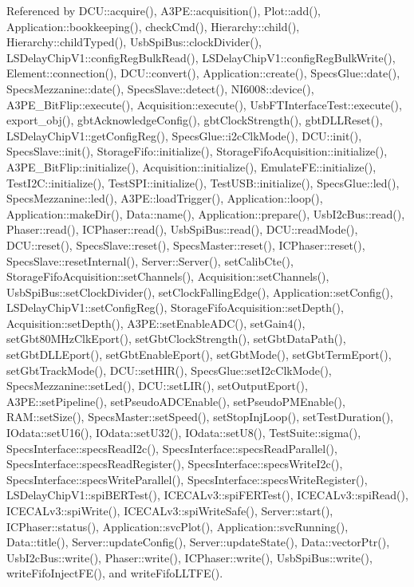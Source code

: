 Referenced by D\+C\+U\+::acquire(), A3\+P\+E\+::acquisition(), Plot\+::add(), Application\+::bookkeeping(), check\+Cmd(), Hierarchy\+::child(), Hierarchy\+::child\+Typed(), Usb\+Spi\+Bus\+::clock\+Divider(), L\+S\+Delay\+Chip\+V1\+::config\+Reg\+Bulk\+Read(), L\+S\+Delay\+Chip\+V1\+::config\+Reg\+Bulk\+Write(), Element\+::connection(), D\+C\+U\+::convert(), Application\+::create(), Specs\+Glue\+::date(), Specs\+Mezzanine\+::date(), Specs\+Slave\+::detect(), N\+I6008\+::device(), A3\+P\+E\+\_\+\+Bit\+Flip\+::execute(), Acquisition\+::execute(), Usb\+F\+T\+Interface\+Test\+::execute(), export\+\_\+obj(), gbt\+Acknowledge\+Config(), gbt\+Clock\+Strength(), gbt\+D\+L\+L\+Reset(), L\+S\+Delay\+Chip\+V1\+::get\+Config\+Reg(), Specs\+Glue\+::i2c\+Clk\+Mode(), D\+C\+U\+::init(), Specs\+Slave\+::init(), Storage\+Fifo\+::initialize(), Storage\+Fifo\+Acquisition\+::initialize(), A3\+P\+E\+\_\+\+Bit\+Flip\+::initialize(), Acquisition\+::initialize(), Emulate\+F\+E\+::initialize(), Test\+I2\+C\+::initialize(), Test\+S\+P\+I\+::initialize(), Test\+U\+S\+B\+::initialize(), Specs\+Glue\+::led(), Specs\+Mezzanine\+::led(), A3\+P\+E\+::load\+Trigger(), Application\+::loop(), Application\+::make\+Dir(), Data\+::name(), Application\+::prepare(), Usb\+I2c\+Bus\+::read(), Phaser\+::read(), I\+C\+Phaser\+::read(), Usb\+Spi\+Bus\+::read(), D\+C\+U\+::read\+Mode(), D\+C\+U\+::reset(), Specs\+Slave\+::reset(), Specs\+Master\+::reset(), I\+C\+Phaser\+::reset(), Specs\+Slave\+::reset\+Internal(), Server\+::\+Server(), set\+Calib\+Cte(), Storage\+Fifo\+Acquisition\+::set\+Channels(), Acquisition\+::set\+Channels(), Usb\+Spi\+Bus\+::set\+Clock\+Divider(), set\+Clock\+Falling\+Edge(), Application\+::set\+Config(), L\+S\+Delay\+Chip\+V1\+::set\+Config\+Reg(), Storage\+Fifo\+Acquisition\+::set\+Depth(), Acquisition\+::set\+Depth(), A3\+P\+E\+::set\+Enable\+A\+D\+C(), set\+Gain4(), set\+Gbt80\+M\+Hz\+Clk\+Eport(), set\+Gbt\+Clock\+Strength(), set\+Gbt\+Data\+Path(), set\+Gbt\+D\+L\+L\+Eport(), set\+Gbt\+Enable\+Eport(), set\+Gbt\+Mode(), set\+Gbt\+Term\+Eport(), set\+Gbt\+Track\+Mode(), D\+C\+U\+::set\+H\+I\+R(), Specs\+Glue\+::set\+I2c\+Clk\+Mode(), Specs\+Mezzanine\+::set\+Led(), D\+C\+U\+::set\+L\+I\+R(), set\+Output\+Eport(), A3\+P\+E\+::set\+Pipeline(), set\+Pseudo\+A\+D\+C\+Enable(), set\+Pseudo\+P\+M\+Enable(), R\+A\+M\+::set\+Size(), Specs\+Master\+::set\+Speed(), set\+Stop\+Inj\+Loop(), set\+Test\+Duration(), I\+Odata\+::set\+U16(), I\+Odata\+::set\+U32(), I\+Odata\+::set\+U8(), Test\+Suite\+::sigma(), Specs\+Interface\+::specs\+Read\+I2c(), Specs\+Interface\+::specs\+Read\+Parallel(), Specs\+Interface\+::specs\+Read\+Register(), Specs\+Interface\+::specs\+Write\+I2c(), Specs\+Interface\+::specs\+Write\+Parallel(), Specs\+Interface\+::specs\+Write\+Register(), L\+S\+Delay\+Chip\+V1\+::spi\+B\+E\+R\+Test(), I\+C\+E\+C\+A\+Lv3\+::spi\+F\+E\+R\+Test(), I\+C\+E\+C\+A\+Lv3\+::spi\+Read(), I\+C\+E\+C\+A\+Lv3\+::spi\+Write(), I\+C\+E\+C\+A\+Lv3\+::spi\+Write\+Safe(), Server\+::start(), I\+C\+Phaser\+::status(), Application\+::svc\+Plot(), Application\+::svc\+Running(), Data\+::title(), Server\+::update\+Config(), Server\+::update\+State(), Data\+::vector\+Ptr(), Usb\+I2c\+Bus\+::write(), Phaser\+::write(), I\+C\+Phaser\+::write(), Usb\+Spi\+Bus\+::write(), write\+Fifo\+Inject\+F\+E(), and write\+Fifo\+L\+L\+T\+F\+E().


